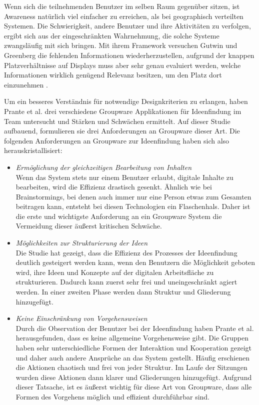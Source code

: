 Wenn sich die teilnehmenden Benutzer im selben Raum gegenüber sitzen, ist Awareness natürlich viel einfacher zu erreichen, als bei geographisch verteilten Systemen. Die Schwierigkeit, andere Benutzer und ihre Aktivitäten zu verfolgen, ergibt sich aus der eingeschränkten Wahrnehmung, die solche Systeme zwangsläufig mit sich bringen. Mit ihrem Framework versuchen Gutwin und Greenberg die fehlenden Informationen wiederherzustellen, aufgrund der knappen Platzverhältnisse auf Displays muss aber sehr genau evaluiert werden, welche Informationen wirklich genügend Relevanz besitzen, um den Platz dort einzunehmen \citep{Gutwin:1999}.

\medskip Um ein besseres Verständnis für notwendige Designkriterien zu erlangen, haben Prante et al. drei verschiedene Groupware Applikationen für Ideenfindung im Team untersucht und Stärken und Schwächen ermittelt. Auf dieser Studie aufbauend, formulieren sie drei Anforderungen an Groupware dieser Art. Die folgenden Anforderungen an Groupware zur Ideenfindung haben sich also herauskristallisiert:

\begin{itemize}
	\item{\emph{Ermöglichung der gleichzeitigen Bearbeitung von Inhalten} \\
		 Wenn das System stets nur einem Benutzer erlaubt, digitale Inhalte zu bearbeiten, wird die Effizienz drastisch gesenkt. Ähnlich wie bei Brainstormings, bei denen auch immer nur eine Person etwas zum Gesamten beitragen kann, entsteht bei diesen Technologien ein Flaschenhals. Daher ist die erste und wichtigste Anforderung an ein Groupware System die Vermeidung dieser äußerst kritischen Schwäche.
	}
	\item{\emph{Möglichkeiten zur Strukturierung der Ideen} \\
		Die Studie hat gezeigt, dass die Effizienz des Prozesses der Ideenfindung deutlich gesteigert werden kann, wenn den Benutzern die Möglichkeit geboten wird, ihre Ideen und Konzepte auf der digitalen Arbeitsfläche zu strukturieren. Dadurch kann zuerst sehr frei und uneingeschränkt agiert werden. In einer zweiten Phase werden dann Struktur und Gliederung hinzugefügt.
	}
	\item{\emph{Keine Einschränkung von Vorgehensweisen} \\
		Durch die Observation der Benutzer bei der Ideenfindung haben Prante et al. herausgefunden, dass es keine allgemeine Vorgehensweise gibt. Die Gruppen haben sehr unterschiedliche Formen der Interaktion und Kooperation gezeigt und daher auch andere Ansprüche an das System gestellt. Häufig erschienen die Aktionen chaotisch und frei von jeder Struktur. Im Laufe der Sitzungen wurden diese Aktionen dann klarer und Gliederungen hinzugefügt. Aufgrund dieser Tatsache, ist es äußerst wichtig für diese Art von Groupware, dass alle Formen des Vorgehens möglich und effizient durchführbar sind. 
	}
\end{itemize}
\begin{flushright}
	 \citep{Prante:2002p86}
\end{flushright}

